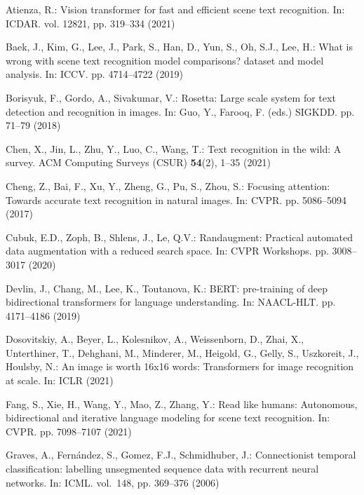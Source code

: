 \documentclass[runningheads]{llncs}
\begin{document}

\begin{thebibliography}{10}
\providecommand{\url}[1]{\texttt{#1}}
\providecommand{\urlprefix}{URL }
\providecommand{\doi}[1]{https://doi.org/#1}

Atienza, R.: Vision transformer for fast and efficient scene text recognition.
  In: ICDAR. vol. 12821, pp. 319--334 (2021)

Baek, J., Kim, G., Lee, J., Park, S., Han, D., Yun, S., Oh, S.J., Lee, H.: What
  is wrong with scene text recognition model comparisons? dataset and model
  analysis. In: ICCV. pp. 4714--4722 (2019)

Borisyuk, F., Gordo, A., Sivakumar, V.: Rosetta: Large scale system for text
  detection and recognition in images. In: Guo, Y., Farooq, F. (eds.) SIGKDD.
  pp. 71--79 (2018)

Chen, X., Jin, L., Zhu, Y., Luo, C., Wang, T.: Text recognition in the wild: A
  survey. ACM Computing Surveys (CSUR)  \textbf{54}(2),  1--35 (2021)

Cheng, Z., Bai, F., Xu, Y., Zheng, G., Pu, S., Zhou, S.: Focusing attention:
  Towards accurate text recognition in natural images. In: CVPR. pp. 5086--5094
  (2017)

Cubuk, E.D., Zoph, B., Shlens, J., Le, Q.V.: Randaugment: Practical automated
  data augmentation with a reduced search space. In: {CVPR} Workshops. pp.
  3008--3017 (2020)

Devlin, J., Chang, M., Lee, K., Toutanova, K.: {BERT:} pre-training of deep
  bidirectional transformers for language understanding. In: NAACL-HLT. pp.
  4171--4186 (2019)

Dosovitskiy, A., Beyer, L., Kolesnikov, A., Weissenborn, D., Zhai, X.,
  Unterthiner, T., Dehghani, M., Minderer, M., Heigold, G., Gelly, S.,
  Uszkoreit, J., Houlsby, N.: An image is worth 16x16 words: Transformers for
  image recognition at scale. In: ICLR (2021)

Fang, S., Xie, H., Wang, Y., Mao, Z., Zhang, Y.: Read like humans: Autonomous,
  bidirectional and iterative language modeling for scene text recognition. In:
  CVPR. pp. 7098--7107 (2021)

Graves, A., Fern{\'{a}}ndez, S., Gomez, F.J., Schmidhuber, J.: Connectionist
  temporal classification: labelling unsegmented sequence data with recurrent
  neural networks. In: ICML. vol.~148, pp. 369--376 (2006)


\end{thebibliography}
\end{document}
